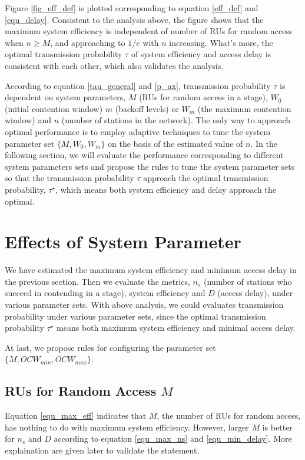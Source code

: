 Figure \ref{fig_eff_def} is plotted corresponding to equation \ref{eff_def} and \ref{equ_delay}.
Consistent to the analysis above, the figure shows that the maximum system efficiency is independent of number of RUs for random access when $n\geq M$, and approaching to $1/e$ with $n$ increasing. 
What's more, the optimal transmission probability $\tau$ of system efficiency and access delay is consistent with each other, which also validates the analysis. 

According to equation \ref{tau_general} and \ref{p_ax}, transmission probability $\tau$ is dependent on system parameters, $M$ (RUs for random access in a stage), $W_0$ (initial contention window) $m$ (backoff levels) or $W_m$ (the maximum contention window) and $n$ (number of stations in the network).
The only way to approach optimal performance is to employ adaptive techniques to tune the system parameter set $\lbrace M, W_0, W_m \rbrace$ on the basis of the estimated value of $n$.
In the following section, we will evaluate the performance corresponding to different system parameters sets and propose the rules to tune the system parameter sets so that the transmission probability $\tau$ approach the optimal transmission probability, $\tau^\star$, which means both system efficiency and delay approach the optimal. 

\section{Effects of System Parameter} 	\label{sec_perf_eval}
We have estimated the maximum system efficiency and minimum access delay in the previous section. Then we evaluate the metrics, $n_s$ (number of stations who succeed in contending in a stage), system efficiency and $D$ (access delay), under various parameter sets. 
With above analysis, we could evaluates transmission probability under various parameter sets, since the optimal transmission probability $\tau^\star$ means both maximum system efficiency and minimal access delay.

At last, we propose rules for configuring the parameter set $\lbrace M, OCW_{min}, OCW_{max}\rbrace$.

\subsection{RUs for Random Access $M$}
\label{M}
Equation \ref{equ_max_eff} indicates that $M$, the number of RUs for random access, has nothing to do with maximum system efficiency. 
However, larger $M$ is better for $n_s$ and $D$ according to equation \ref{equ_max_ns} and \ref{equ_min_delay}. More explaination are given later to validate the statement. 

